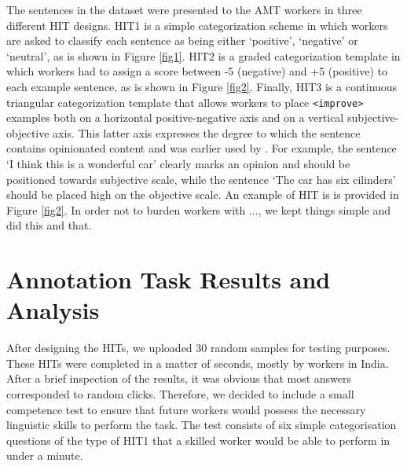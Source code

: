 \documentclass[11pt,letterpaper]{article}
\begin{document}
The sentences in the dataset were presented to the AMT workers in three different HIT designs. HIT1 is a simple categorization scheme in which workers are asked to classify each sentence as being either `positive', `negative' or `neutral', as is shown in Figure \ref{fig1}. HIT2 is a graded categorization template in which workers had to assign a score between -5 (negative) and +5 (positive) to each example sentence, as is shown in Figure \ref{fig2}. Finally, HIT3 is a continuous triangular categorization template that allows workers to place \texttt{<improve>} examples both on a horizontal positive-negative axis and on a vertical subjective-objective axis. This latter axis expresses the degree to which the sentence contains opinionated content and was earlier used by \cite{sentiwordnet:06}. For example, the sentence `I think this is a wonderful car' clearly marks an opinion and should be positioned towards subjective scale, while the sentence `The car has six cilinders' should be placed high on the objective scale. An example of HIT is is provided in Figure \ref{fig2}. In order not to burden workers with ..., we kept things simple and did this and that.


\section{Annotation Task Results and Analysis}
\label{sect:results}

After designing the HITs, we uploaded 30 random samples for testing purposes. These HITs were completed in a matter of seconds, mostly by workers in India. After a brief inspection of the results, it was obvious that most answers corresponded to random clicks. Therefore, we decided to include a small competence test to ensure that future workers would possess the necessary linguistic skills to perform the task. The test consists of six simple categorisation questions of the type of HIT1 that a skilled worker would be able to perform in under a minute.
\end{document}
